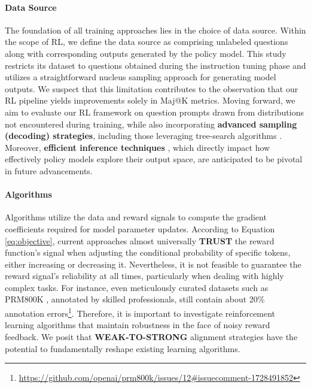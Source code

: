 \begin{itemize}[topsep=0pt]
\paragraph{Data Source} The foundation of all training approaches lies in the choice of data source. Within the scope of RL, we define the data source as comprising unlabeled questions along with corresponding outputs generated by the policy model. This study restricts its dataset to questions obtained during the instruction tuning phase and utilizes a straightforward nucleus sampling approach for generating model outputs. We suspect that this limitation contributes to the observation that our RL pipeline yields improvements solely in Maj@K metrics. Moving forward, we aim to evaluate our RL framework on question prompts drawn from distributions not encountered during training, while also incorporating \textbf{advanced sampling (decoding) strategies}, including those leveraging tree-search algorithms \citep{yao2023tree}. Moreover, \textbf{efficient inference techniques} \citep{xia-etal-2023-speculative,leviathan2023fast,kwon2023efficient,xia2024unlocking}, which directly impact how effectively policy models explore their output space, are anticipated to be pivotal in future advancements.

\paragraph{Algorithms} Algorithms utilize the data and reward signals to compute the gradient coefficients required for model parameter updates. According to Equation \ref{eq:objective}, current approaches almost universally \textbf{TRUST} the reward function’s signal when adjusting the conditional probability of specific tokens, either increasing or decreasing it. Nevertheless, it is not feasible to guarantee the reward signal’s reliability at all times, particularly when dealing with highly complex tasks. For instance, even meticulously curated datasets such as PRM800K \citep{lightman2023let}, annotated by skilled professionals, still contain about 20\% annotation errors\footnote{\url{https://github.com/openai/prm800k/issues/12\#issuecomment-1728491852}}. Therefore, it is important to investigate reinforcement learning algorithms that maintain robustness in the face of noisy reward feedback. We posit that \textbf{WEAK-TO-STRONG} \citep{burns2023weak} alignment strategies have the potential to fundamentally reshape existing learning algorithms.


\end{itemize}
